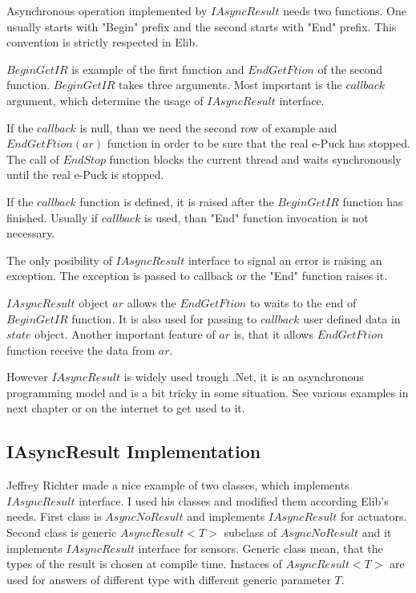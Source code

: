 	Asynchronous operation implemented by $IAsyncResult$ needs two functions. One usually starts with 
	"Begin" prefix and the second starts with "End" prefix. This convention is strictly respected in Elib.

	$BeginGetIR$ is example of the first function and $EndGetFtion$ of the second function.
	$BeginGetIR$ takes three arguments. Most important is the $callback$ argument, which determine
	the usage of $IAsyncResult$ interface.

	If the $callback$ is null, than we need the second row of example and $EndGetFtion(ar)$ function
	in order to be sure that the real e-Puck has stopped.
	The call of $EndStop$ function blocks the current thread and waits synchronously until the real
	e-Puck is stopped.

	If the $callback$ function is defined, it is raised after the $BeginGetIR$ function has finished.
	Usually if $callback$ is used, than "End" function invocation is not necessary.

	The only posibility of $IAsyncResult$ interface to signal an error is raising an exception.
	The exception is passed to callback or the "End" function raises it.

	$IAsyncResult$ object $ar$ allows the $EndGetFtion$ to waits to the end of $BeginGetIR$ function.
	It is also used for passing to $callback$ user defined data in $state$ object.
	Another important feature of $ar$ is, that it allows $EndGetFtion$ function receive the data
	from $ar$.
	
	However $IAsyncResult$ is widely used trough .Net, it is an asynchronous programming model
	and is a bit tricky in some situation. See various examples in next chapter or on the internet 
	to get used to it.
\subsection{IAsyncResult Implementation} \label{sec:iasyncimpl}
	Jeffrey Richter made a nice example \cite{IAsync} of two classes, which implements $IAsyncResult$ interface.
	I used his classes and modified them according Elib's needs.
	First class is $AsyncNoResult$ and implements $IAsyncResult$ for actuators.
	Second class is generic $AsyncResult<T>$ subclass of $AsyncNoResult$ and it implements $IAsyncResult$ interface for sensors.
	Generic class mean, that the types of the result is chosen at compile time. %
	Instaces of $AsyncResult<T>$ are used
	for answers of different type with different generic parameter $T$.

